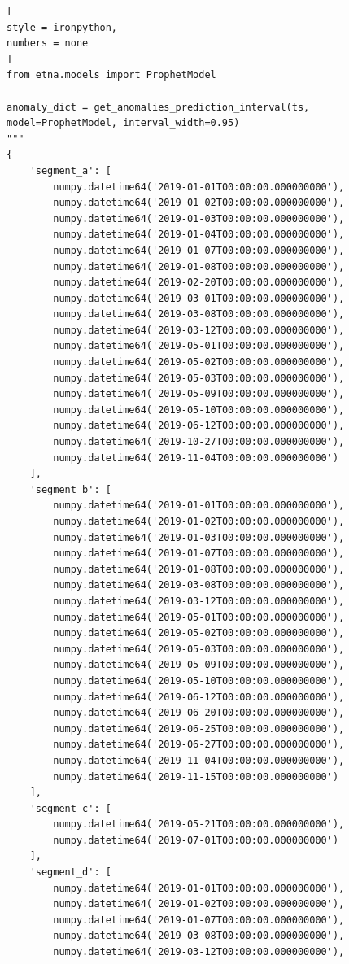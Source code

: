 \documentclass[%
	11pt,
	a4paper,
	utf8,
		]{article}
\begin{document}
\begin{lstlisting}[
style = ironpython,
numbers = none
]
from etna.models import ProphetModel

anomaly_dict = get_anomalies_prediction_interval(ts, model=ProphetModel, interval_width=0.95)
"""
{
	'segment_a': [
		numpy.datetime64('2019-01-01T00:00:00.000000000'),
		numpy.datetime64('2019-01-02T00:00:00.000000000'),
		numpy.datetime64('2019-01-03T00:00:00.000000000'),
		numpy.datetime64('2019-01-04T00:00:00.000000000'),
		numpy.datetime64('2019-01-07T00:00:00.000000000'),
		numpy.datetime64('2019-01-08T00:00:00.000000000'),
		numpy.datetime64('2019-02-20T00:00:00.000000000'),
		numpy.datetime64('2019-03-01T00:00:00.000000000'),
		numpy.datetime64('2019-03-08T00:00:00.000000000'),
		numpy.datetime64('2019-03-12T00:00:00.000000000'),
		numpy.datetime64('2019-05-01T00:00:00.000000000'),
		numpy.datetime64('2019-05-02T00:00:00.000000000'),
		numpy.datetime64('2019-05-03T00:00:00.000000000'),
		numpy.datetime64('2019-05-09T00:00:00.000000000'),
		numpy.datetime64('2019-05-10T00:00:00.000000000'),
		numpy.datetime64('2019-06-12T00:00:00.000000000'),
		numpy.datetime64('2019-10-27T00:00:00.000000000'),
		numpy.datetime64('2019-11-04T00:00:00.000000000')
	],
	'segment_b': [
		numpy.datetime64('2019-01-01T00:00:00.000000000'),
		numpy.datetime64('2019-01-02T00:00:00.000000000'),
		numpy.datetime64('2019-01-03T00:00:00.000000000'),
		numpy.datetime64('2019-01-07T00:00:00.000000000'),
		numpy.datetime64('2019-01-08T00:00:00.000000000'),
		numpy.datetime64('2019-03-08T00:00:00.000000000'),
		numpy.datetime64('2019-03-12T00:00:00.000000000'),
		numpy.datetime64('2019-05-01T00:00:00.000000000'),
		numpy.datetime64('2019-05-02T00:00:00.000000000'),
		numpy.datetime64('2019-05-03T00:00:00.000000000'),
		numpy.datetime64('2019-05-09T00:00:00.000000000'),
		numpy.datetime64('2019-05-10T00:00:00.000000000'),
		numpy.datetime64('2019-06-12T00:00:00.000000000'),
		numpy.datetime64('2019-06-20T00:00:00.000000000'),
		numpy.datetime64('2019-06-25T00:00:00.000000000'),
		numpy.datetime64('2019-06-27T00:00:00.000000000'),
		numpy.datetime64('2019-11-04T00:00:00.000000000'),
		numpy.datetime64('2019-11-15T00:00:00.000000000')
	],
	'segment_c': [
		numpy.datetime64('2019-05-21T00:00:00.000000000'),
		numpy.datetime64('2019-07-01T00:00:00.000000000')
    ],
	'segment_d': [
		numpy.datetime64('2019-01-01T00:00:00.000000000'),
		numpy.datetime64('2019-01-02T00:00:00.000000000'),
		numpy.datetime64('2019-01-07T00:00:00.000000000'),
		numpy.datetime64('2019-03-08T00:00:00.000000000'),
		numpy.datetime64('2019-03-12T00:00:00.000000000'),

\end{lstlisting}
\end{document}
